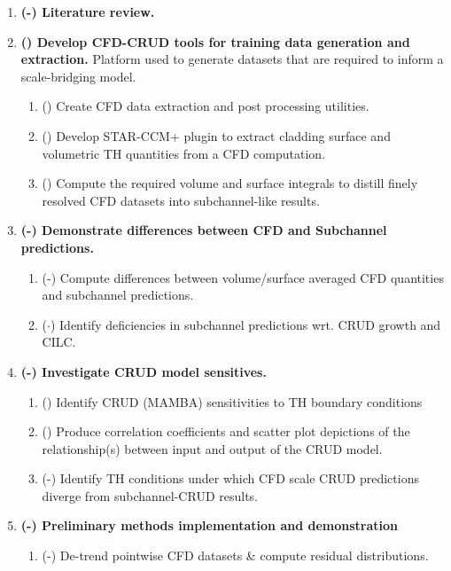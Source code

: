 \begin{enumerate}
\item \textbf{(\checkmark-) Literature review.}
\item \textbf{(\checkmark) Develop CFD-CRUD tools for training data generation and extraction.}
          Platform used to generate datasets that are
          required to inform a scale-bridging model.
    \begin{enumerate}
        \item (\checkmark) Create CFD data extraction and post processing utilities.
        \item (\checkmark) Develop STAR-CCM+ plugin to extract cladding surface and volumetric TH quantities from a CFD computation.
        \item (\checkmark) Compute the required volume and surface integrals to
              distill finely resolved CFD datasets into subchannel-like results.
    \end{enumerate}
\item \textbf{(\checkmark-) Demonstrate differences between CFD and Subchannel predictions.}
    \begin{enumerate}
        \item (\checkmark-) Compute differences between volume/surface averaged CFD quantities and subchannel predictions.
        \item ($\cdot$) Identify deficiencies in subchannel predictions wrt. CRUD growth and CILC.
    \end{enumerate}
\item \textbf{(\checkmark-) Investigate CRUD model sensitives.}
    \begin{enumerate}
        \item (\checkmark) Identify CRUD (MAMBA) sensitivities to TH boundary conditions
        \item (\checkmark) Produce correlation coefficients and scatter plot depictions of the relationship(s) between input
              and output of the CRUD model.
          \item (\checkmark-) Identify TH conditions under which CFD scale CRUD predictions diverge from subchannel-CRUD results.
    \end{enumerate}
\item \textbf{(\checkmark-) Preliminary methods implementation and demonstration}
    \begin{enumerate}
        \item (\checkmark-) De-trend pointwise CFD datasets \& compute residual distributions.

\end{enumerate}
\end{enumerate}
